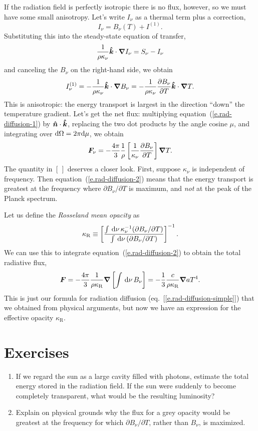 If the radiation field is perfectly isotropic there is no flux, however, so we must have some small anisotropy. Let's write $I_{\nu}$ as a thermal term plus a correction, 
\[ I_{\nu} = B_{\nu}(T) + I^{(1)}. \]
Substituting this into the steady-state equation of transfer,
\[ \frac{1}{\rho\kappa_{\nu}}\boldsymbol{\hat{k}}\cdot\boldsymbol{\nabla} I_{\nu}  = S_{\nu} - I_{\nu}\]
and canceling the $B_{\nu}$ on the right-hand side, we obtain
\begin{equation}\label{e.rad-diffusion-1}
I_{\nu}^{(1)} = -\frac{1}{\rho\kappa_{\nu}} \boldsymbol{\hat{k}}\cdot\boldsymbol{\nabla} B_{\nu} = -\frac{1}{\rho\kappa_{\nu}} \frac{\partial B_{\nu}}{\partial T} \boldsymbol{\hat{k}}\cdot\boldsymbol{\nabla} T.
\end{equation}
This is anisotropic: the energy transport is largest in the direction ``down'' the temperature gradient. Let's get the net flux: multiplying equation~(\ref{e.rad-diffusion-1}) by $\boldsymbol{\hat{n}}\cdot\boldsymbol{\hat{k}}$, replacing the two dot products by the angle cosine $\mu$, and integrating over $\mathrm{d} \Omega = 2\pi \mathrm{d}\mu$, we obtain
\begin{equation}\label{e.rad-diffusion-2}
\boldsymbol{F}_{\nu} = -\frac{4\pi}{3}\frac{1}{\rho}\left[\frac{1}{\kappa_{\nu}}\frac{\partial B_{\nu}}{\partial T}\right]\boldsymbol{\nabla} T.
\end{equation}
The quantity in $[\,]$ deserves a closer look. First, suppose $\kappa_{\nu}$ is independent of frequency. Then equation~(\ref{e.rad-diffusion-2}) means that the energy transport is greatest at the frequency where $\partial B_{\nu}/\partial T$ is maximum, and \emph{not} at the peak of the Planck spectrum. 

Let us define the \emph{Rosseland mean opacity} as
\[ \kappa_{\mathrm{R}} \equiv \left[\frac{\int\,\mathrm{d}\nu\,\kappa_{\nu}^{-1}(\partial B_{\nu}/\partial T)}{\int \,\mathrm{d}\nu\, (\partial B_{\nu}/\partial T)}\right]^{-1}. \]
We can use this to integrate equation~(\ref{e.rad-diffusion-2}) to obtain the total radiative flux,
\begin{equation}\label{e.rad-flux}
\boldsymbol{F} = - \frac{4\pi}{3} \frac{1}{\rho\kappa_{\mathrm{R}}} \boldsymbol{\nabla}\left[\int\,\mathrm{d}\nu\,B_{\nu}\right] = - \frac{1}{3} \frac{c}{\rho\kappa_{\mathrm{R}}} \boldsymbol{\nabla} aT^{4}.
\end{equation}
This is just our formula for radiation diffusion (eq.~[\ref{e.rad-diffusion-simple}]) that we obtained from physical arguments, but now we have an expression for the effective opacity $\kappa_{\mathrm{R}}$.

\section{Exercises}
\begin{enumerate}
\item If we regard the sun as a large cavity filled with photons, estimate the total energy stored in the radiation field.  If the sun were suddenly to become completely transparent, what would be the resulting luminosity?

\item Explain on physical grounds why the flux for a grey opacity would be greatest at the frequency for which $\partial B_{\nu}/\partial T$, rather than $B_{\nu}$, is maximized.

\end{enumerate}

